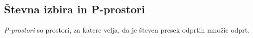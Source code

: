     


    
    
    

\subsection{Števna izbira in P-prostori}

\begin{definicija}
  \emph{P-prostori} so prostori, za katere velja, da je števen presek odprtih
  množic odprt.
\end{definicija}


